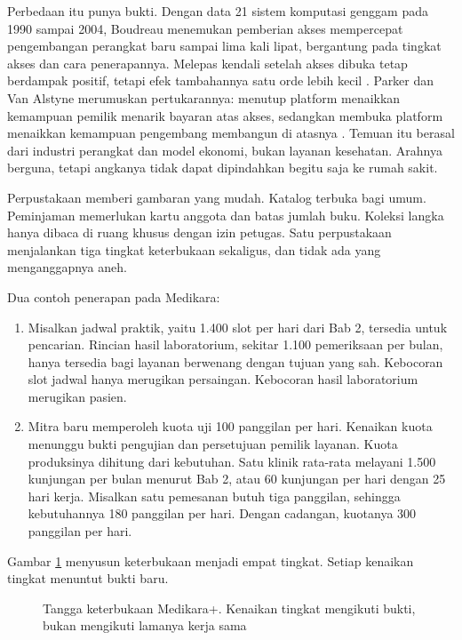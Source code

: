 Perbedaan itu punya bukti. Dengan data 21 sistem komputasi genggam pada 1990 sampai 2004, Boudreau
menemukan pemberian akses mempercepat pengembangan perangkat baru sampai lima kali lipat, bergantung
pada tingkat akses dan cara penerapannya. Melepas kendali setelah akses dibuka tetap berdampak positif,
tetapi efek tambahannya satu orde lebih kecil \cite{c03-boudreau2010open}. Parker dan Van Alstyne
merumuskan pertukarannya: menutup platform menaikkan kemampuan pemilik menarik bayaran atas akses,
sedangkan membuka platform menaikkan kemampuan pengembang membangun di atasnya
\cite{c03-parker2018innovation}. Temuan itu berasal dari industri perangkat dan model ekonomi, bukan
layanan kesehatan. Arahnya berguna, tetapi angkanya tidak dapat dipindahkan begitu saja ke rumah sakit.

Perpustakaan memberi gambaran yang mudah. Katalog terbuka bagi umum. Peminjaman memerlukan kartu
anggota dan batas jumlah buku. Koleksi langka hanya dibaca di ruang khusus dengan izin petugas. Satu
perpustakaan menjalankan tiga tingkat keterbukaan sekaligus, dan tidak ada yang menganggapnya aneh.

Dua contoh penerapan pada Medikara:
\begin{enumerate}
  \item Misalkan jadwal praktik, yaitu 1.400 slot per hari dari Bab 2, tersedia untuk pencarian. Rincian
        hasil laboratorium, sekitar 1.100 pemeriksaan per bulan, hanya tersedia bagi layanan berwenang
        dengan tujuan yang sah. Kebocoran slot jadwal hanya merugikan persaingan. Kebocoran hasil
        laboratorium merugikan pasien.
  \item Mitra baru memperoleh kuota uji 100 panggilan per hari. Kenaikan kuota menunggu bukti pengujian
        dan persetujuan pemilik layanan. Kuota produksinya dihitung dari kebutuhan. Satu klinik
        rata-rata melayani 1.500 kunjungan per bulan menurut Bab 2, atau 60 kunjungan per hari dengan 25
        hari kerja. Misalkan satu pemesanan butuh tiga panggilan, sehingga kebutuhannya 180 panggilan
        per hari. Dengan cadangan, kuotanya 300 panggilan per hari.
\end{enumerate}

Gambar \ref{fig:ch03-tangga-keterbukaan} menyusun keterbukaan menjadi empat tingkat. Setiap kenaikan
tingkat menuntut bukti baru.

\begin{figure}[!htb]
  \centering
  
  \caption{Tangga keterbukaan Medikara+. Kenaikan tingkat mengikuti bukti, bukan mengikuti lamanya
           kerja sama}
  \label{fig:ch03-tangga-keterbukaan}
\end{figure}

